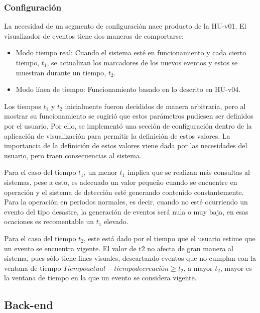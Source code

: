 \subsubsection*{Configuración}
\label{subsubsec:config}

La necesidad de un segmento de configuración nace producto de la HU-v01. El visualizador de eventos tiene dos maneras de comportarse:

\begin{itemize}
\item Modo tiempo real: Cuando el sistema esté en funcionamiento y cada cierto tiempo, $t_{1}$, se actualizan los marcadores de los nuevos eventos y estos se muestran durante un tiempo, $t_{2}$.
\item Modo línea de tiempo: Funcionamiento basado en lo descrito en HU-v04.
\end{itemize}

Los tiempos $t_{1}$ y $t_{2}$ inicialmente fueron decididos de manera arbitraria, pero al mostrar su funcionamiento se sugirió que estos parámetros pudiesen ser definidos por el usuario. Por ello, se implementó una sección de configuración dentro de la aplicación de visualización para permitir la definición de estos valores. La importancia de la definición de estos valores viene dada por las necesidades del usuario, pero traen consecuencias al sistema.

Para el caso del tiempo $t_{1}$, un menor $t_{1}$ implica que se realizan más consultas al sistemas, pese a esto, es adecuado un valor pequeño cuando se encuentre en operación y el sistema de detección esté generando contenido constantemente. Para la operación en periodos normales, es decir, cuando no esté ocurriendo un evento del tipo desastre, la generación de eventos será nula o muy baja, en esas ocaciones es recomentable un $t_{1}$ elevado.

Para el caso del tiempo $t_{2}$, este está dado por el tiempo que el usuario estime que un evento se encuentra vigente. El valor de t2 no afecta de gran manera al sistema, pues sólo tiene fines visuales, descartando eventos que no cumplan con la ventana de tiempo $Tiempo actual - tiempo de creación \geq t_{2}$, a mayor $t_{2}$, mayor es la ventana de tiempo en la que un evento se considera vigente.

\subsection{Back-end}
\label{subsec:detectorNecesidades}

